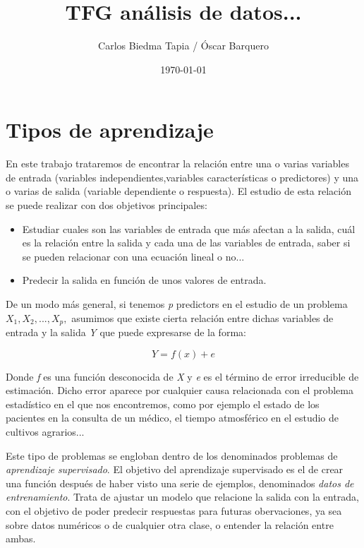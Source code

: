 \documentclass[12pt,a4paper,Spanish]{book}
\author{Carlos Biedma Tapia / Óscar Barquero}
\title{TFG análisis de datos...}
\date{\today}
\begin{document}
\maketitle
\tableofcontents
\listoffigures

\chapter{Tipos de aprendizaje}

En este trabajo trataremos de encontrar la relación entre una o varias variables de entrada (variables independientes,variables características o predictores) y una o varias de salida (variable dependiente o respuesta). El estudio de esta relación se puede realizar con dos objetivos principales:


\begin{itemize}
\item Estudiar cuales son las variables de entrada que más afectan a la salida, cuál es la relación entre la salida y cada una de las variables de entrada, saber si se pueden relacionar con una ecuación lineal o no... 

\item Predecir la salida en función de unos valores de entrada.
\end{itemize}

De un modo más general, si tenemos \textit{p} predictors en el estudio de un problema  
$X_1,X_2,...,X_p,$ asumimos que existe cierta relación entre dichas variables de entrada y la salida \textit{Y} que puede expresarse de la forma:

\begin{equation}
Y=f(x)+e
\end{equation}

Donde \textit{f} es una función desconocida de \textit{X} y \textit{e} es el término de error irreducible de estimación. Dicho error aparece por cualquier causa relacionada con el problema estadístico en el que nos encontremos, como por ejemplo el estado de los pacientes en la consulta de un médico, el tiempo atmosférico en el estudio de cultivos agrarios...

Este tipo de problemas se engloban dentro de los denominados problemas de \textit{aprendizaje supervisado}. El objetivo del aprendizaje supervisado es el de crear una función después de haber visto una serie de ejemplos, denominados \textit{datos de entrenamiento}. Trata de ajustar un modelo que relacione la salida con la entrada, con el objetivo de poder predecir respuestas para futuras obervaciones, ya sea sobre datos numéricos o de cualquier otra clase, o entender la relación entre ambas.
\end{document}

